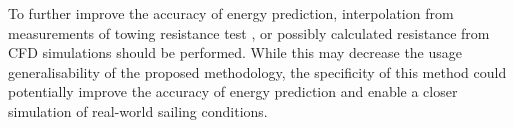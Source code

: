 To further improve the accuracy of energy prediction, interpolation from measurements of towing resistance test , or possibly calculated resistance from CFD simulations should be performed. While this may decrease the usage generalisability of the proposed methodology, the specificity of this method could potentially improve the accuracy of energy prediction and enable a closer simulation of real-world sailing conditions.\\
















